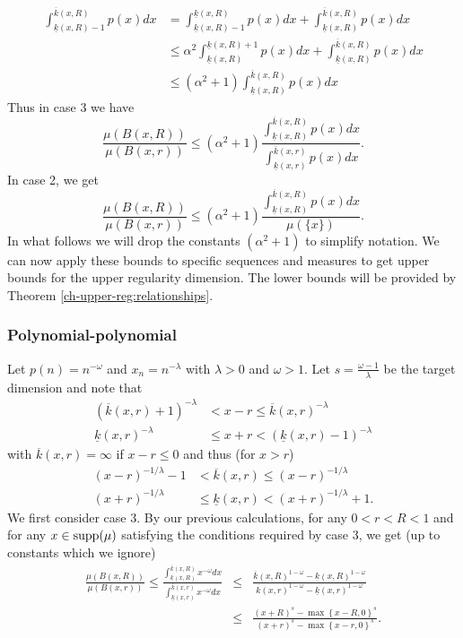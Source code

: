 \begin{align*}
\int_{\underline{k}(x,R)-1}^{\overline{k}(x,R)} p(x)dx &=\int_{\underline{k}(x,R)-1}^{\underline{k}(x,R)} p(x)dx + \int_{\underline{k}(x,R)}^{\overline{k}(x,R)} p(x)dx \\
&\le \alpha^2\int_{\underline{k}(x,R)}^{\underline{k}(x,R)+1} p(x)dx + \int_{\underline{k}(x,R)}^{\overline{k}(x,R)} p(x)dx \\
&\le (\alpha^2+1) \int_{\underline{k}(x,R)}^{\overline{k}(x,R)} p(x)dx 
\end{align*}
Thus in case 3 we have 
\[
\frac{\mu(B(x,R))}{\mu(B(x,r))} \le (\alpha^2+1) \frac{\int_{\underline{k}(x,R)}^{\overline{k}(x,R)} p(x)dx}{\int_{\underline{k}(x,r)}^{\overline{k}(x,r)} p(x)dx}.
\]
In case 2, we get 
\[
\frac{\mu(B(x,R))}{\mu(B(x,r))} \le (\alpha^2+1)  \frac{\int_{\underline{k}(x,R)}^{\overline{k}(x,R)} p(x)dx}{\mu(\{x\})}.
\]
In what follows we will drop the constants $(\alpha^2+1) $ to simplify notation.  We can now apply these bounds to specific sequences and measures to get upper bounds for the upper regularity dimension.  The lower bounds will be provided by Theorem \ref{ch-upper-reg:relationships}.

\subsubsection{Polynomial-polynomial}

Let $p(n)=n^{-\omega}$ and $x_n=n^{-\lambda}$ with $\lambda>0$ and $\omega>1$.  Let $s=\frac{\omega-1}{\lambda}$ be the target dimension and note that
\begin{align*}
(\overline{k}(x,r)+1)^{-\lambda}&<x-r\le \overline{k}(x,r)^{-\lambda} \\
\underline{k}(x,r)^{-\lambda}&\le x+r< (\underline{k}(x,r)-1)^{-\lambda} 
\end{align*}
with $\overline{k}(x,r) = \infty$ if $x-r\le 0$ and thus (for $x > r$)
\begin{align*}
(x-r)^{-1/\lambda}-1 &< \overline{k}(x,r) \le (x-r)^{-1/\lambda} \\
(x+r)^{-1/\lambda} &\le \underline{k}(x,r) < (x+r)^{-1/\lambda}+1.
\end{align*}
We first consider case 3. By our previous calculations, for any $0<r<R<1$ and for any $x\in \textup{supp}(\mu)$ satisfying the conditions required by case 3, we get (up to constants which we ignore)
\begin{eqnarray}\label{eq:bound-sequences}
	\frac{\mu(B(x,R))}{\mu(B(x,r))} \le \frac{\int_{\underline{k}(x,R)}^{\overline{k}(x,R)} x^{-\omega}dx}{\int_{\underline{k}(x,r)}^{\overline{k}(x,r)} x^{-\omega}dx} &\le& \frac{\overline{k}(x,R)^{1-\omega}-\underline{k}(x,R)^{1-\omega}}{\overline{k}(x,r)^{1-\omega}-\underline{k}(x,r)^{1-\omega}} \nonumber\\ 
	& \le & \frac{(x+R)^{s}-\max\left\{ x-R,0\right\}^{s}}{(x+r)^{s}-\max\left\{x-r,0\right\}^s}. 
\end{eqnarray}



